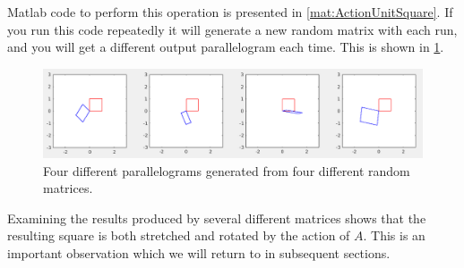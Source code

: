 \documentclass[onefignum,onetabnum]{siamart190516}
\begin{document}
Matlab code to perform this operation is presented in \cref{mat:ActionUnitSquare}. If
you run this code repeatedly it will generate a new random matrix with
each run, and you will get a different output parallelogram each time.
This is shown in \cref{fig:4Parallelograms}.
\begin{figure}[thb]
	\centering
	\includegraphics[width=1.0\columnwidth]{4Parallelograms.png}
	\caption{Four different parallelograms generated from four different random matrices.}
	\label{fig:4Parallelograms}
\end{figure}
Examining the results produced by several different matrices shows that
the resulting square is both stretched and rotated by the action of $A$.  This is
an important observation which we will return to in subsequent sections.
\end{document}
